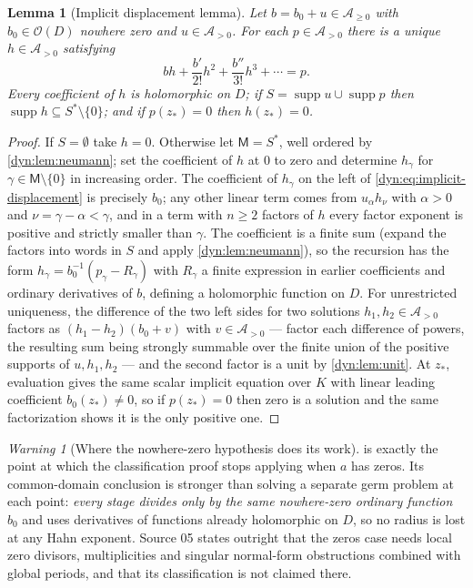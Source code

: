 \documentclass[11pt,letterpaper]{article}
\newtheorem{lemma}[lemma]{Lemma}
\theoremstyle{definition}
\theoremstyle{remark}
\newtheorem{warning}[warning]{Warning}
\newcommand{\OO}{\mathcal O}
\newcommand{\AAA}{\mathscr A}
\newcommand{\supp}{\operatorname{supp}}
\numberwithin{equation}{section}
\begin{document}
\begin{lemma}[Implicit displacement lemma]\label{dyn:lem:displacement2}
Let $b=b_0+u\in\AAA_{\ge0}$ with $b_0\in\OO(D)$ nowhere zero and
$u\in\AAA_{>0}$. For each $p\in\AAA_{>0}$ there is a unique
$h\in\AAA_{>0}$ satisfying
\begin{equation}\label{dyn:eq:implicit-displacement}
 bh+\frac{b'}{2!}h^{2}+\frac{b''}{3!}h^{3}+\cdots=p .
\end{equation}
Every coefficient of $h$ is holomorphic on $D$; if
$S=\supp u\cup\supp p$ then $\supp h\subseteq S^{*}\setminus\{0\}$; and if
$p(z_{*})=0$ then $h(z_{*})=0$.
\end{lemma}
\begin{proof}
If $S=\emptyset$ take $h=0$. Otherwise let $\mathsf M=S^{*}$, well ordered
by \cref{dyn:lem:neumann}; set the coefficient of $h$ at $0$ to zero and
determine $h_\gamma$ for $\gamma\in\mathsf M\setminus\{0\}$ in increasing
order. The coefficient of $h_\gamma$ on the left of
\eqref{dyn:eq:implicit-displacement} is precisely $b_0$; any other linear
term comes from $u_\alpha h_\nu$ with $\alpha>0$ and
$\nu=\gamma-\alpha<\gamma$, and in a term with $n\ge2$ factors of $h$ every
factor exponent is positive and strictly smaller than $\gamma$. The
coefficient is a finite sum (expand the factors into words in $S$ and apply
\cref{dyn:lem:neumann}), so the recursion has the form
$h_\gamma=b_0^{-1}(p_\gamma-R_\gamma)$ with $R_\gamma$ a finite expression
in earlier coefficients and ordinary derivatives of $b$, defining a
holomorphic function on $D$. For unrestricted uniqueness, the difference of
the two left sides for two solutions $h_1,h_2\in\AAA_{>0}$ factors as
$(h_1-h_2)(b_0+v)$ with $v\in\AAA_{>0}$ --- factor each difference of
powers, the resulting sum being strongly summable over the finite union of
the positive supports of $u,h_1,h_2$ --- and the second factor is a unit by
\cref{dyn:lem:unit}. At $z_{*}$, evaluation gives the same scalar implicit
equation over $K$ with linear leading coefficient $b_0(z_{*})\ne0$, so if
$p(z_{*})=0$ then zero is a solution and the same factorization shows it is
the only positive one.
\end{proof}

\begin{warning}[Where the nowhere-zero hypothesis does its work]
\label{dyn:warn:nowherezero}
 is exactly the point at which the
classification proof stops applying when $a$ has zeros. Its
common-domain conclusion is stronger than solving a separate germ problem
at each point: \emph{every stage divides only by the same nowhere-zero
ordinary function $b_0$} and uses derivatives of functions already
holomorphic on $D$, so no radius is lost at any Hahn exponent. Source 05
states outright that the zeros case needs local zero divisors,
multiplicities and singular normal-form obstructions combined with global
periods, and that its classification is not claimed there.
\end{warning}
\end{document}
